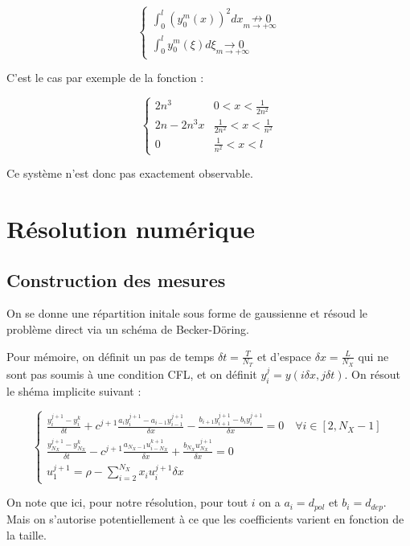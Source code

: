 \documentclass[a4paper]{article}
\newcommand{\pol}{d_{pol}}
\newcommand{\dep}{d_{dep}}
\begin{document}
\[
\begin{cases}
	\int_0^l (y_0^m(x))^2 dx \underset{m\to+\infty}{\nrightarrow 0} \\
	\int_0^l y_0^m(\xi)d\xi \underset{m\to+\infty}{\rightarrow 0}
\end{cases}
\]

C'est le cas par exemple de la fonction :

\[
\begin{cases}
	2n^3 & 0 <x < \frac{1}{2n^2}\\
	2n - 2n^3x & \frac{1}{2n^2} <x<\frac{1}{n^2}\\
	0 & \frac{1}{n^2} <x<l
\end{cases}
\]

Ce système n'est donc pas exactement observable.

\section{Résolution numérique}

\subsection{Construction des mesures}

On se donne une répartition initale sous forme de gaussienne et résoud le problème direct via un schéma de Becker-Döring.

Pour mémoire, on définit un pas de temps $\delta t = \frac{T}{N_T}$ 
et d'espace $\delta x = \frac{L}{N_X}$ qui ne sont pas soumis à une condition CFL, 
et on définit $y^{j}_{i} = y(i \delta x,j \delta t)$. On résout le shéma implicite suivant :

\[ \begin{cases} \displaystyle \frac{y^{j+1}_i - y^k_i}{\delta t} + c^{j+1} \frac{a_iy^{j+1}_i - a_{i-1}y^{j+1}_{i-1}}{\delta x} - \frac{b_{i+1}y^{j+1}_{i+1} - b_iy^{j+1}_{i}}{\delta x} = 0 \quad \forall i \in [2,N_X-1]\\
\displaystyle \frac{y^{j+1}_{N_X} - y^k_{N_X}}{\delta t} -  c^{j+1} \frac{a_{N_X-1}u^{k+1}_{i-N_X}}{\delta x} + \frac{b_{N_X}u^{j+1}_{N_X}}{\delta x} = 0 \\
u^{j+1}_1 = \rho - \sum_{i=2}^{N_X} x_i u^{j+1}_i \delta x
\end{cases} \]

On note que ici, pour notre résolution, pour tout $i$ on a $a_i = \pol$ et $b_i =\dep$. 
Mais on s'autorise potentiellement à ce que les coefficients varient en fonction de la taille.
\end{document}
